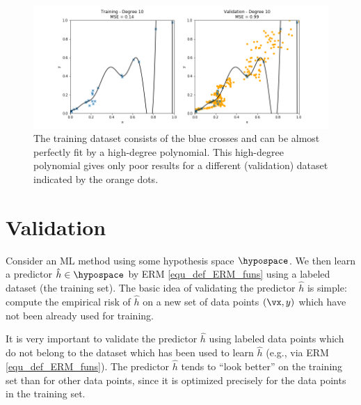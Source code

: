 \documentclass[12pt]{report}
\begin{document}
\begin{figure}[htbp]
	\centering
	\includegraphics[width=\textwidth]{OverfittedPolyn.png}  
	\caption{The training dataset consists of the blue crosses and can be almost perfectly 
		fit by a high-degree polynomial. This high-degree polynomial gives only poor results 
		for a different (validation) dataset indicated by the orange dots.}
	\label{fig_polyn_training}
\end{figure}


\section{Validation}
\label{sec_validate_predictor}

Consider an ML method using some hypothesis space $\hypospace$. 
We then learn a predictor $\hat{h} \in \hypospace$ by ERM \eqref{equ_def_ERM_funs} 
using a labeled dataset (the training set). The basic idea of validating the 
predictor $\hat{h}$ is simple: compute the empirical risk of $\hat{h}$ on a 
new set of data points $(\vx,y)$ which have not been already used for training. 

It is very important to validate the predictor $\hat{h}$ using labeled data 
points which do not belong to the dataset which has been used to learn 
$\hat{h}$ (e.g., via ERM \eqref{equ_def_ERM_funs}). The predictor $\hat{h}$ 
tends to ``look better'' on the training set than for other data points, 
since it is optimized precisely for the data points in the training set. 
\vspace*{2mm}
\begin{center}
\end{center}
 
\end{document}
